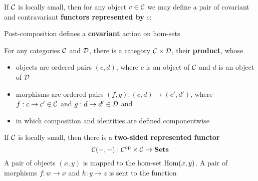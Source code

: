 \documentclass[11pt]{article}
\def \Cop {\calc^{\op}}
\begin{document}
\begin{definition}[]
If \(\mathcal{C}\) is locally small, then for any object \(c\in\mathcal{C}\) we may define a pair of covariant and
contravariant \textbf{functors represented by} \(c\):
\begin{center}\hspace{1cm}
\end{center}
\end{definition}

Post-composition defines a \textbf{covariant} action on hom-sets

\begin{definition}[]
For any categories \(\mathcal{C}\) and \(\mathcal{D}\), there is a category \(\mathcal{C}\times\mathcal{D}\), their \textbf{product}, whose
\begin{itemize}
\item objects are ordered pairs \((c,d)\), where \(c\) is an object of \(\mathcal{C}\) and \(d\) is an object
of \(\mathcal{D}\)
\item morphisms are ordered pairs \((f,g):(c,d)\to(c',d')\), where \(f:c\to c'\in\mathcal{C}\) and \(g:d\to d'\in\mathcal{D}\) and
\item in which composition and identities are defined componentwise
\end{itemize}
\end{definition}

\begin{definition}[]
If \(\mathcal{C}\) is locally small, then there is a \textbf{two-sided represented functor}
\begin{equation*}
\calc(-,-):\Cop\times\calc\to\Sets
\end{equation*}
A pair of objects \((x,y)\) is mapped to the hom-set \(\operatorname{Hom}(x,y)\). A pair of
morphisms \(f:w\to x\) and \(h:y\to z\) is sent to the function
\begin{center}\end{center}
\end{definition}
\end{document}
